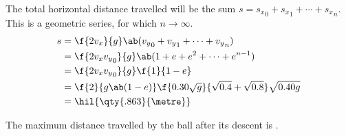 The total horizontal distance travelled will be
the sum \(s = {s_x}_0 + {s_x}_1 + \cdots + {s_x}_n\).
This is a geometric series, for which \(n\to\infty\).
\begin{align*}
	s & = \f{2v_x}{g}\ab({v_y}_0 + {v_y}_1 + \cdots + {v_y}_n)                \\
	  & = \f{2v_x{v_y}_0}{g}\ab(1 + e + e^2 + \cdots + e^{n-1})               \\
	  & = \f{2v_x{v_y}_0}{g}\f{1}{1-e}                                        \\
	  & = \f{2}{g\ab(1-e)}\f{0.30\sqrt{g}}{\sqrt{0.4}+\sqrt{0.8}}\sqrt{0.40g} \\
	  & = \hil{\qty{.863}{\metre}}
\end{align*}

The maximum distance travelled by the ball after its descent is
.
